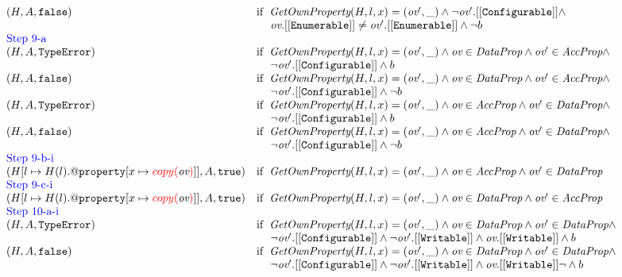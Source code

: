 \documentclass[a4paper, leqno]{amsart}
\def\inred{\color{red}}
\def\inblue{\color{blue}}
\newcommand{\false}{{\tt false}}
\newcommand{\true}{{\tt true}}
\newcommand{\te}{{\tt TypeError}}
\newcommand{\hf}[1]{\emph{#1}}
\newcommand{\ifc}[1]{{\rm if}\begin{array}[t]{l}#1\end{array}}
\def\inred{\color{red}}
\def\inblue{\color{blue}}
\begin{document}
\[\begin{array}{l@{}c@{}l}
{\begin{array}{ll}
(H,A,\false)
&\ifc{\hf{GetOwnProperty}(H,l,x) = (\emph{ov}', \_) \wedge
  \neg \emph{ov}'.{\tt[[Configurable]]} \wedge}\\
&\mbox{\phantom{if \ }$\emph{ov}.{\tt[[Enumerable]]}\not=\emph{ov}'.{\tt[[Enumerable]]} \wedge \neg b$}\\
\multicolumn{2}{l}{\mbox{\inblue Step 9-a}}\\
(H,A,\te)
&\ifc{\hf{GetOwnProperty}(H,l,x) = (\emph{ov}', \_) \wedge
\emph{ov} \in \emph{DataProp} \wedge
\emph{ov}' \in \emph{AccProp} \wedge}\\
&\mbox{\phantom{if \ }$
\neg \emph{ov}'.{\tt[[Configurable]]} \wedge b$}\\
(H,A,\false)
&\ifc{\hf{GetOwnProperty}(H,l,x) = (\emph{ov}', \_) \wedge
\emph{ov} \in \emph{DataProp} \wedge
\emph{ov}' \in \emph{AccProp} \wedge}\\
&\mbox{\phantom{if \ }$
\neg \emph{ov}'.{\tt[[Configurable]]} \wedge \neg b$}\\
(H,A,\te)
&\ifc{\hf{GetOwnProperty}(H,l,x) = (\emph{ov}', \_) \wedge
\emph{ov} \in \emph{AccProp} \wedge
\emph{ov}' \in \emph{DataProp} \wedge}\\
&\mbox{\phantom{if \ }$
\neg \emph{ov}'.{\tt[[Configurable]]} \wedge b$}\\
(H,A,\false)
&\ifc{\hf{GetOwnProperty}(H,l,x) = (\emph{ov}', \_) \wedge
\emph{ov} \in \emph{AccProp} \wedge
\emph{ov}' \in \emph{DataProp} \wedge}\\
&\mbox{\phantom{if \ }$
\neg \emph{ov}'.{\tt[[Configurable]]} \wedge \neg b$}\\
\multicolumn{2}{l}{\mbox{\inblue Step 9-b-i}}\\
(H[l\mapsto H(l).{\tt@property}[x\mapsto{\inred copy(}\emph{ov}{\inred)}]], A,\true)
&\ifc{\hf{GetOwnProperty}(H,l,x) = (\emph{ov}', \_) \wedge
\emph{ov} \in \emph{AccProp} \wedge
\emph{ov}' \in \emph{DataProp}}\\
\multicolumn{2}{l}{\mbox{\inblue Step 9-c-i}}\\
(H[l\mapsto H(l).{\tt@property}[x\mapsto{\inred copy(}\emph{ov}{\inred)}]], A,\true)
&\ifc{\hf{GetOwnProperty}(H,l,x) = (\emph{ov}', \_) \wedge
\emph{ov} \in \emph{DataProp} \wedge
\emph{ov}' \in \emph{AccProp}}\\

\multicolumn{2}{l}{\mbox{\inblue Step 10-a-i}}\\
(H,A,\te)
&\ifc{\hf{GetOwnProperty}(H,l,x) = (\emph{ov}', \_) \wedge
\emph{ov} \in \emph{DataProp} \wedge
\emph{ov}' \in \emph{DataProp} \wedge}\\
&\mbox{\phantom{if \ }$
\neg \emph{ov}'.{\tt[[Configurable]]} \wedge \neg\emph{ov}'.{\tt[[Writable]]} \wedge
\emph{ov}.{\tt[[Writable]]}
 \wedge b$}\\
(H,A,\false)
&\ifc{\hf{GetOwnProperty}(H,l,x) = (\emph{ov}', \_) \wedge
\emph{ov} \in \emph{DataProp} \wedge
\emph{ov}' \in \emph{DataProp} \wedge}\\
&\mbox{\phantom{if \ }$
\neg \emph{ov}'.{\tt[[Configurable]]} \wedge \neg\emph{ov}'.{\tt[[Writable]]} \wedge
\emph{ov}.{\tt[[Writable]]}
\neg \wedge b$}\\


\end{array}}
\end{array}\]
\end{document}
